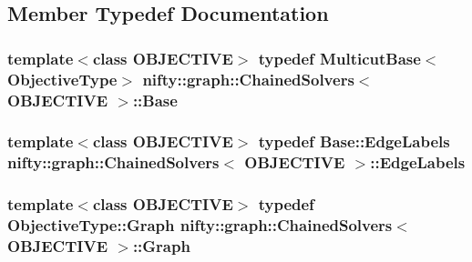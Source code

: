 \subsection{Member Typedef Documentation}
\hypertarget{classnifty_1_1graph_1_1ChainedSolvers_af3c13fd5bc8d12ef88678d8191886f1a}{}
\subsubsection[{Base}]{\setlength{\rightskip}{0pt plus 5cm}template$<$class O\+B\+J\+E\+C\+T\+I\+V\+E$>$ typedef {\bf Multicut\+Base}$<${\bf Objective\+Type}$>$ {\bf nifty\+::graph\+::\+Chained\+Solvers}$<$ O\+B\+J\+E\+C\+T\+I\+V\+E $>$\+::{\bf Base}}\label{classnifty_1_1graph_1_1ChainedSolvers_af3c13fd5bc8d12ef88678d8191886f1a}
\hypertarget{classnifty_1_1graph_1_1ChainedSolvers_a28c50d486ee20744432cc66e2bab9890}{}
\subsubsection[{Edge\+Labels}]{\setlength{\rightskip}{0pt plus 5cm}template$<$class O\+B\+J\+E\+C\+T\+I\+V\+E$>$ typedef {\bf Base\+::\+Edge\+Labels} {\bf nifty\+::graph\+::\+Chained\+Solvers}$<$ O\+B\+J\+E\+C\+T\+I\+V\+E $>$\+::{\bf Edge\+Labels}}\label{classnifty_1_1graph_1_1ChainedSolvers_a28c50d486ee20744432cc66e2bab9890}
\hypertarget{classnifty_1_1graph_1_1ChainedSolvers_a74491b36d70e81078f265943e85a51ab}{}
\subsubsection[{Graph}]{\setlength{\rightskip}{0pt plus 5cm}template$<$class O\+B\+J\+E\+C\+T\+I\+V\+E$>$ typedef Objective\+Type\+::\+Graph {\bf nifty\+::graph\+::\+Chained\+Solvers}$<$ O\+B\+J\+E\+C\+T\+I\+V\+E $>$\+::{\bf Graph}}\label{classnifty_1_1graph_1_1ChainedSolvers_a74491b36d70e81078f265943e85a51ab}
\hypertarget{classnifty_1_1graph_1_1ChainedSolvers_ab55e77819ad5f20d4c1193ed745b49fe}{}
